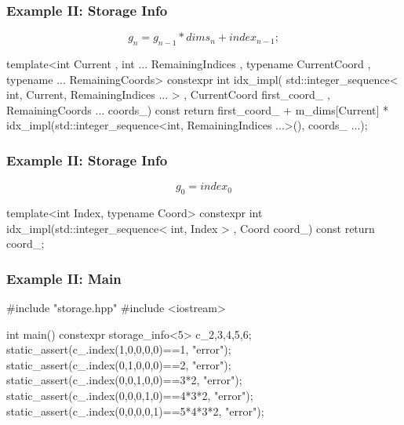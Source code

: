 \documentclass[aspectratio=43]{beamer}
\begin{document}
\begin{frame}[fragile]\frametitle{Example II: Storage Info}
  $$
      g_n = g_{n-1} * dims_n + index_{n-1};
  $$
  \begin{Cpplisting}{}
template<int Current
         , int ... RemainingIndices
         , typename CurrentCoord
         , typename ... RemainingCoords>
constexpr int idx_impl(
        std::integer_sequence< int,  Current, RemainingIndices ... >
        , CurrentCoord first_coord_
        , RemainingCoords ... coords_) const {
  return first_coord_
  + m_dims[Current]
  * idx_impl(std::integer_sequence<int, RemainingIndices ...>(), coords_ ...);
}
  \end{Cpplisting}
\end{frame}


\begin{frame}[fragile]\frametitle{Example II: Storage Info}
$$
  g_0 = index_0
$$
  \begin{Cpplisting}{}
template<int Index, typename Coord>
constexpr int idx_impl(std::integer_sequence< int, Index > , Coord coord_) const{
  return coord_;
}
  \end{Cpplisting}
\end{frame}


\begin{frame}[fragile]\frametitle{Example II: Main}
  \begin{Cpplisting}[: main ]{}
#include "storage.hpp"
#include <iostream>

int main(){
    constexpr storage_info<5> c_{2,3,4,5,6};
    static_assert(c_.index(1,0,0,0,0)==1, "error");
    static_assert(c_.index(0,1,0,0,0)==2, "error");
    static_assert(c_.index(0,0,1,0,0)==3*2, "error");
    static_assert(c_.index(0,0,0,1,0)==4*3*2, "error");
    static_assert(c_.index(0,0,0,0,1)==5*4*3*2, "error");
}
  \end{Cpplisting}
\end{frame}
\end{document}
